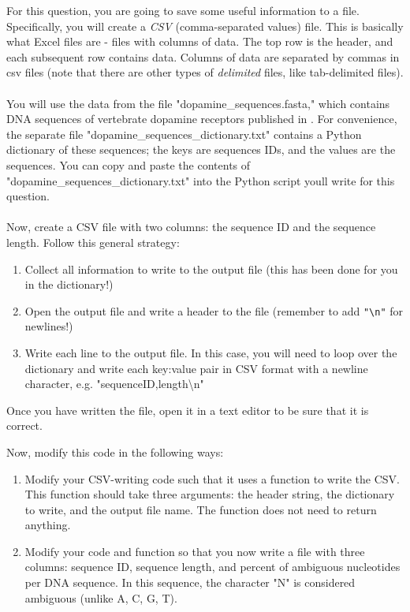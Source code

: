 \documentclass{article}[12pt]
\newcommand{\code}[1]{\texttt{#1}}  %
\begin{document}
	For this question, you are going to save some useful information to a file. Specifically, you will create a \emph{CSV} (comma-separated values) file. This is basically what Excel files are - files with columns of data. The top row is the header, and each subsequent row contains data. Columns of data are separated by commas in csv files (note that there are other types of \emph{delimited} files, like tab-delimited files). 
	\\\\ You will use the data from the file "dopamine\_sequences.fasta," which contains DNA sequences of vertebrate dopamine receptors published in \citet{SpielmanKumarWilke2015}. For convenience, the separate file "dopamine\_sequences\_dictionary.txt" contains a Python dictionary of these sequences; the keys are sequences IDs, and the values are the sequences. You can copy and paste the contents of "dopamine\_sequences\_dictionary.txt" into the Python script you\textquotesingle ll write for this question.
	\\\\ Now, create a CSV file with two columns: the sequence ID and the sequence length. Follow this general strategy:
	\begin{enumerate}[itemsep=2ex]
		\item Collect all information to write to the output file (this has been done for you in the dictionary!)
		\item Open the output file and write a header to the file (remember to add \code{"\textbackslash n"} for newlines!)
		\item Write each line to the output file. In this case, you will need to loop over the dictionary and write each key:value pair in CSV format with a newline character, e.g. "sequenceID,length\textbackslash n"
	\end{enumerate}
	Once you have written the file, open it in a text editor to be sure that it is correct.
	
	Now, modify this code in the following ways:
	\begin{enumerate}[itemsep=2ex]
		
		\item Modify your CSV-writing code such that it uses a function to write the CSV. This function should take three arguments: the header string, the dictionary to write, and the output file name. The function does not need to return anything.
		
		\item Modify your code and function so that you now write a file with three columns: sequence ID, sequence length, and percent of ambiguous nucleotides per DNA sequence. In this sequence, the character "N" is considered ambiguous (unlike A, C, G, T).
		
	\end{enumerate}

	




\end{document}
